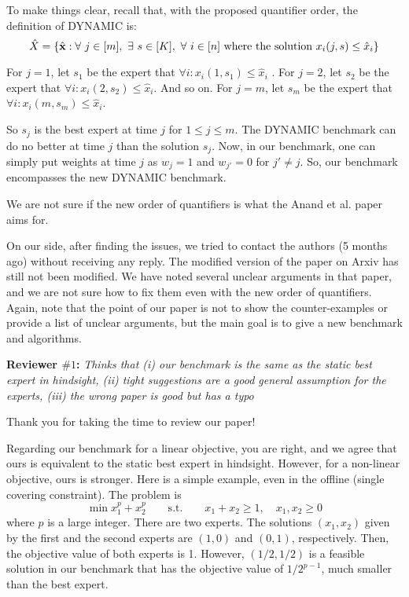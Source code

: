 \documentclass[12pt]{article}
\begin{document}
To make things clear, recall that, with the proposed quantifier order, the definition of DYNAMIC is:
$$
\hat{X} = \{\hat{\textbf{x}} : \forall\ j \in [m], \ \exists\ s \in [K], \ \forall\ i \in [n] \textnormal{ where the solution } x_i(j,s) \le \hat{x}_i \}
$$

For $j = 1$, let $s_{1}$ be the expert that $\forall i: x_i(1,s_{1}) \le \hat{x}_i$ . 
For $j = 2$, let $s_{2}$ be the expert that $\forall i: x_i(2,s_{2}) \le \hat{x}_i$.
And so on.
For $j = m$, let $s_{m}$ be the expert that $\forall i : x_i(m,s_{m}) \le \hat{x}_i$.

So $s_{j}$ is the best expert at time $j$ for $1 \leq j \leq m$. The DYNAMIC benchmark can do no better at time $j$ than the solution $s_{j}$. 
Now, in our benchmark, one can simply put weights at time $j$ as $w_{j} = 1$ and $w_{j'} = 0$ for $j' \neq j$. So, our benchmark encompasses the new DYNAMIC benchmark. 

We are not sure if the new order of quantifiers is what the Anand et al. paper aims for.  

On our side, after finding the issues, we tried to contact the authors (5 months ago) without receiving any reply. The modified version of the paper on Arxiv has still not been modified. We have noted several unclear arguments in that paper, and we are not sure how to fix them even with the new order of quantifiers. 
Again, note that the point of our paper is not to show the counter-examples or provide a list of unclear arguments, but the main goal is to give a new benchmark and algorithms.

\noindent \textbf{Reviewer $\#1$:} 
\textit{\color{red} Thinks that (i) our benchmark is the same as the static best expert in hindsight, (ii) tight suggestions are a good general assumption for the experts, (iii) the wrong paper is good but has a typo}

Thank you for taking the time to review our paper! 

Regarding our benchmark for a linear objective, you are right, and we agree that ours is equivalent to the static best expert in hindsight. However, for a non-linear objective, ours is stronger. Here is a simple example, even in the offline (single covering constraint). The problem is
$$
\min x_{1}^{p} + x_{2}^{p}	
\qquad
\text{s.t.}
\qquad
x_{1} + x_{2} \geq 1, 
\quad x_{1}, x_{2} \geq 0 
$$ 
where $p$ is a large integer. 
There are two experts. The solutions $(x_{1}, x_{2})$ given by the first and the second experts are $(1,0)$ and $(0,1)$, respectively. 
Then, the objective value of both experts is 1.  However, $(1/2, 1/2)$ is a feasible solution in our benchmark that has the objective value of $1/2^{p-1}$, 
much smaller than the best expert.  
\end{document}
